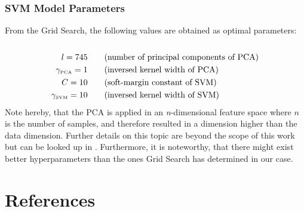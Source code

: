 \documentclass[11pt,a4paper,twoside]{article}
\theoremstyle{thmbreak}
\numberwithin{Theorem}{subsection}
\theoremstyle{defbreak}
\theoremstyle{remark}
\theoremstyle{remark}
\begin{document}
\subsubsection{SVM Model Parameters}
From the Grid Search, the following values are   obtained as optimal parameters: \\\\
\begin{align*}
l = 745 \qquad &\text{(number of principal components of PCA)}\\
\gamma_{\text{\tiny PCA}} =  1 \qquad &\text{(inversed kernel width of PCA)}\\
C = 10 \qquad &\text{(soft-margin constant of SVM)}\\
\gamma_{\text{\tiny SVM}} = 10 \qquad &\text{(inversed kernel width of SVM)}
\end{align*}
Note hereby, that the PCA is applied in an \textit{n}-dimensional feature space where $n$ is the number of samples, and therefore resulted in a dimension higher than the data dimension. Further details on this topic are beyond the scope of this work but can be looked up in \cite{steinwart2008support}.
Furthermore, it is noteworthy, that there might exist better hyperparameters than the ones Grid Search has determined in our case.


\newpage
\section{References}
{\small


}
\end{document}
